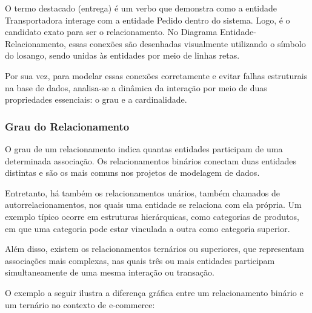 O termo destacado (entrega) é um verbo que demonstra como a entidade Transportadora interage com a entidade Pedido dentro do sistema. Logo, é o candidato exato para ser o relacionamento. No Diagrama Entidade-Relacionamento, essas conexões são desenhadas visualmente utilizando o símbolo do losango, sendo unidas às entidades por meio de linhas retas.

Por sua vez, para modelar essas conexões corretamente e evitar falhas estruturais na base de dados, analisa-se a dinâmica da interação por meio de duas propriedades essenciais: o grau e a cardinalidade.

\subsubsection{Grau do Relacionamento}

O grau de um relacionamento indica quantas entidades participam de uma determinada associação. Os relacionamentos binários conectam duas entidades distintas e são os mais comuns nos projetos de modelagem de dados.

Entretanto, há também os relacionamentos unários, também chamados de autorrelacionamentos, nos quais uma entidade se relaciona com ela própria. Um exemplo típico ocorre em estruturas hierárquicas, como categorias de produtos, em que uma categoria pode estar vinculada a outra como categoria superior.

Além disso, existem os relacionamentos ternários ou superiores, que representam associações mais complexas, nas quais três ou mais entidades participam simultaneamente de uma mesma interação ou transação.

O exemplo a seguir ilustra a diferença gráfica entre um relacionamento binário e um ternário no contexto de e-commerce:

